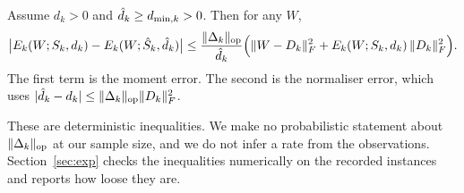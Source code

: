 \begin{lemma}
\label{lem:denom}
Assume $d_k>0$ and $\hat{d}_k\ge d_{\min,k}>0$. Then for any $W$,
\[
\big|E_k(W;S_k,d_k)-E_k(W;\hat{S}_k,\hat{d}_k)\big|\le
\frac{\lVert \Delta_k\rVert_{\mathrm{op}}}{\hat{d}_k}\Big(\lVert W-D_k\rVert_{F}^2+E_k(W;S_k,d_k)\,\lVert D_k\rVert_{F}^2\Big).
\]
The first term is the moment error. The second is the normaliser error, which uses
$|\hat{d}_k-d_k|\le\lVert \Delta_k\rVert_{\mathrm{op}}\lVert D_k\rVert_{F}^2$.
\end{lemma}

These are deterministic inequalities. We make no probabilistic statement about $\lVert \Delta_k\rVert_{\mathrm{op}}$
at our sample size, and we do not infer a rate from the observations. Section~\ref{sec:exp}
checks the inequalities numerically on the recorded instances and reports how loose they are.
